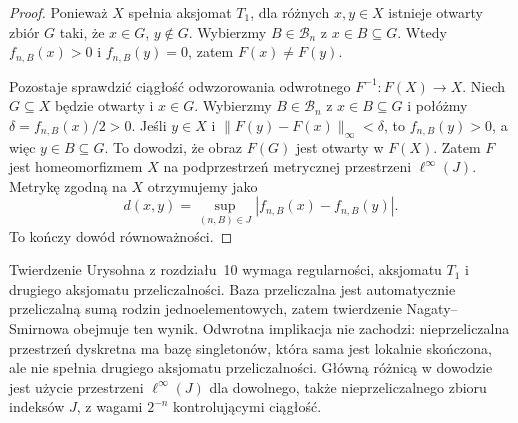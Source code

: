 \begin{proof}
Ponieważ $X$ spełnia aksjomat $T_1$,
dla różnych $x,y\in X$ istnieje
otwarty zbiór $G$ taki, że
$x\in G$, $y\notin G$.
Wybierzmy $B\in\mathcal B_n$
z $x\in B\subseteq G$.
Wtedy $f_{n,B}(x)>0$ i
$f_{n,B}(y)=0$, zatem $F(x)\ne F(y)$.

Pozostaje sprawdzić ciągłość
odwzorowania odwrotnego
$F^{-1}:F(X)\to X$.
Niech $G\subseteq X$ będzie otwarty
i $x\in G$. Wybierzmy
$B\in\mathcal B_n$ z
$x\in B\subseteq G$ i połóżmy
$\delta=f_{n,B}(x)/2>0$.
Jeśli $y\in X$ i
$\|F(y)-F(x)\|_\infty<\delta$,
to $f_{n,B}(y)>0$, a więc
$y\in B\subseteq G$.
To dowodzi, że obraz
$F(G)$ jest otwarty w $F(X)$.
Zatem $F$ jest homeomorfizmem
$X$ na podprzestrzeń metrycznej
przestrzeni $\ell^\infty(J)$.
Metrykę zgodną na $X$ otrzymujemy
jako
\[
d(x,y)=
\sup_{(n,B)\in J}
|f_{n,B}(x)-f_{n,B}(y)|.
\]
To kończy dowód równoważności.
\end{proof}

\begin{uwaga}
\label{rem:topog-parazwartosc-nagata-urysohn}
Twierdzenie Urysohna z rozdziału~10
wymaga regularności, aksjomatu $T_1$
i drugiego aksjomatu przeliczalności.
Baza przeliczalna jest automatycznie
przeliczalną sumą rodzin
jednoelementowych, zatem twierdzenie
Nagaty--Smirnowa obejmuje ten wynik.
Odwrotna implikacja nie zachodzi:
nieprzeliczalna przestrzeń dyskretna
ma bazę singletonów, która sama jest
lokalnie skończona, ale nie spełnia
drugiego aksjomatu przeliczalności.
Główną różnicą w dowodzie jest
użycie przestrzeni $\ell^\infty(J)$
dla dowolnego, także nieprzeliczalnego
zbioru indeksów $J$, z wagami
$2^{-n}$ kontrolującymi ciągłość.
\end{uwaga}
